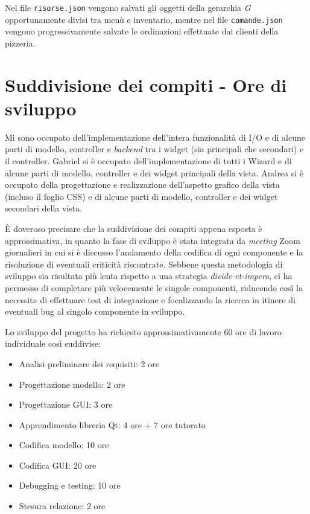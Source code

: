 \documentclass[
  10pt,
]{article}
\providecommand{\tightlist}{%
  \setlength{\itemsep}{0pt}\setlength{\parskip}{0pt}}
\begin{document}
Nel file \texttt{risorse.json} vengono salvati gli oggetti della
gerarchia \emph{G} opportunamente divisi tra menù e inventario, mentre
nel file \texttt{comande.json} vengono progressivamente salvate le
ordinazioni effettuate dai clienti della pizzeria.

\hypertarget{suddivisione-dei-compiti---ore-di-sviluppo}{%
\section{Suddivisione dei compiti - Ore di
sviluppo}\label{suddivisione-dei-compiti---ore-di-sviluppo}}

Mi sono occupato dell'implementazione dell'intera funzionalità di I/O e
di alcune parti di modello, controller e \emph{backend} tra i widget
(sia principali che secondari) e il controller. Gabriel si è occupato
dell'implementazione di tutti i Wizard e di alcune parti di modello,
controller e dei widget principali della vista. Andrea si è occupato
della progettazione e realizzazione dell'aspetto grafico della vista
(incluso il foglio CSS) e di alcune parti di modello, controller e dei
widget secondari della vista.

È doveroso precisare che la suddivisione dei compiti appena esposta è
approssimativa, in quanto la fase di sviluppo è stata integrata da
\emph{meeting} Zoom giornalieri in cui si è discusso l'andamento della
codifica di ogni componente e la risoluzione di eventuali criticità
riscontrate. Sebbene questa metodologia di sviluppo sia risultata più
lenta rispetto a una strategia \emph{divide-et-impera}, ci ha permesso
di completare più velocemente le singole componenti, riducendo così la
necessita di effettuare test di integrazione e focalizzando la ricerca
in itinere di eventuali bug al singolo componente in sviluppo.

Lo sviluppo del progetto ha richiesto approssimativamente 60 ore di
lavoro individuale così suddivise:

\begin{itemize}
\tightlist
\item
  Analisi preliminare dei requisiti: 2 ore
\item
  Progettazione modello: 2 ore
\item
  Progettazione GUI: 3 ore
\item
  Apprendimento libreria Qt: 4 ore + 7 ore tutorato
\item
  Codifica modello: 10 ore
\item
  Codifica GUI: 20 ore
\item
  Debugging e testing: 10 ore
\item
  Stesura relazione: 2 ore
\end{itemize}
\end{document}
